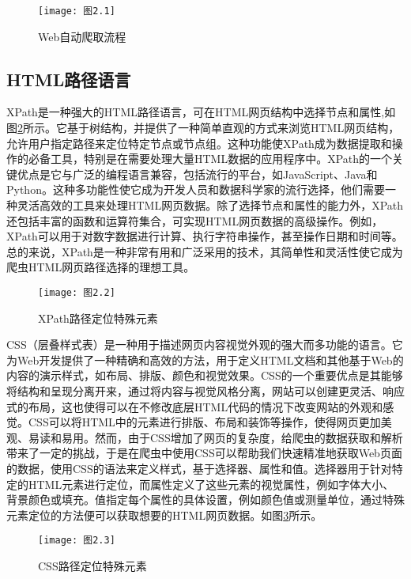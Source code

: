 \documentclass[bachelor_p]{hdu-thesis}
\begin{document}
\begin{figure}[h]
  \centering
  \texttt{[image: 图2.1]}
  \caption{Web自动爬取流程} \label{fig:graph.21}
\end{figure}

\subsection{HTML路径语言}

XPath是一种强大的HTML路径语言，可在HTML网页结构中选择节点和属性,如图\ref{fig:graph.22}所示。它基于树结构，并提供了一种简单直观的方式来浏览HTML网页结构，允许用户指定路径来定位特定节点或节点组。这种功能使XPath成为数据提取和操作的必备工具，特别是在需要处理大量HTML数据的应用程序中。XPath的一个关键优点是它与广泛的编程语言兼容，包括流行的平台，如JavaScript、Java和Python。这种多功能性使它成为开发人员和数据科学家的流行选择，他们需要一种灵活高效的工具来处理HTML网页数据。除了选择节点和属性的能力外，XPath还包括丰富的函数和运算符集合，可实现HTML网页数据的高级操作。例如，XPath可以用于对数字数据进行计算、执行字符串操作，甚至操作日期和时间等。总的来说，XPath是一种非常有用和广泛采用的技术，其简单性和灵活性使它成为爬虫HTML网页路径选择的理想工具。

\begin{figure}[h]
  \centering
  \texttt{[image: 图2.2]}
  \caption{XPath路径定位特殊元素} \label{fig:graph.22}
\end{figure}

CSS（层叠样式表）是一种用于描述网页内容视觉外观的强大而多功能的语言。它为Web开发提供了一种精确和高效的方法，用于定义HTML文档和其他基于Web的内容的演示样式，如布局、排版、颜色和视觉效果。CSS的一个重要优点是其能够将结构和呈现分离开来，通过将内容与视觉风格分离，网站可以创建更灵活、响应式的布局，这也使得可以在不修改底层HTML代码的情况下改变网站的外观和感觉。CSS可以将HTML中的元素进行排版、布局和装饰等操作，使得网页更加美观、易读和易用。然而，由于CSS增加了网页的复杂度，给爬虫的数据获取和解析带来了一定的挑战，于是在爬虫中使用CSS可以帮助我们快速精准地获取Web页面的数据，使用CSS的语法来定义样式，基于选择器、属性和值。选择器用于针对特定的HTML元素进行定位，而属性定义了这些元素的视觉属性，例如字体大小、背景颜色或填充。值指定每个属性的具体设置，例如颜色值或测量单位，通过特殊元素定位的方法便可以获取想要的HTML网页数据。如图\ref{fig:graph.23}所示。

\begin{figure}[h]
  \centering
  \texttt{[image: 图2.3]}
  \caption{CSS路径定位特殊元素} \label{fig:graph.23}
\end{figure}
\end{document}
